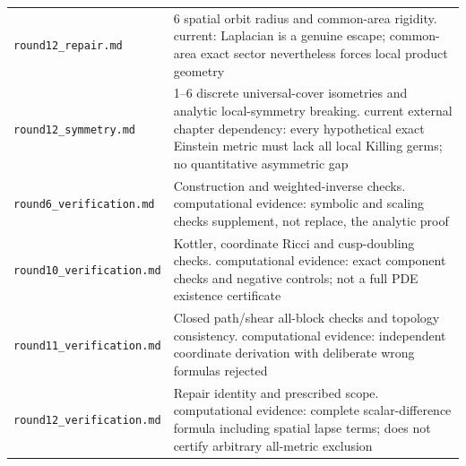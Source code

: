\documentclass[UTF8,fontset=fandol,zihao=-4]{ctexart}
\theoremstyle{cn}
\begin{document}
\begin{longtable}{L{.34\textwidth}L{.59\textwidth}}
\nolinkurl{round12_repair.md} & 6 spatial orbit radius and common-area rigidity. current: Laplacian is a genuine escape; common-area exact sector nevertheless forces local product geometry\\
\nolinkurl{round12_symmetry.md} & 1–6 discrete universal-cover isometries and analytic local-symmetry breaking. current external chapter dependency: every hypothetical exact Einstein metric must lack all local Killing germs; no quantitative asymmetric gap\\
\nolinkurl{round6_verification.md} & Construction and weighted-inverse checks. computational evidence: symbolic and scaling checks supplement, not replace, the analytic proof\\
\nolinkurl{round10_verification.md} & Kottler, coordinate Ricci and cusp-doubling checks. computational evidence: exact component checks and negative controls; not a full PDE existence certificate\\
\nolinkurl{round11_verification.md} & Closed path/shear all-block checks and topology consistency. computational evidence: independent coordinate derivation with deliberate wrong formulas rejected\\
\nolinkurl{round12_verification.md} & Repair identity and prescribed scope. computational evidence: complete scalar-difference formula including spatial lapse terms; does not certify arbitrary all-metric exclusion\\
\bottomrule\end{longtable}\normalsize
\end{document}
